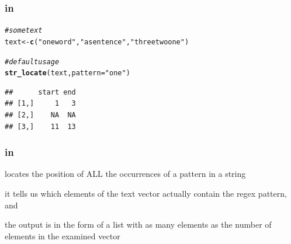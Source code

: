 \documentclass[12pt]{beamer}\usepackage[]{graphicx}\usepackage[]{color}
\makeatletter
\newcommand{\hlstr}[1]{\textcolor[rgb]{0.192,0.494,0.8}{#1}}%
\newcommand{\hlcom}[1]{\textcolor[rgb]{0.678,0.584,0.686}{\textit{#1}}}%
\newcommand{\hlstd}[1]{\textcolor[rgb]{0.345,0.345,0.345}{#1}}%
\newcommand{\hlkwb}[1]{\textcolor[rgb]{0.69,0.353,0.396}{#1}}%
\newcommand{\hlkwc}[1]{\textcolor[rgb]{0.333,0.667,0.333}{#1}}%
\newcommand{\hlkwd}[1]{\textcolor[rgb]{0.737,0.353,0.396}{\textbf{#1}}}%
\newenvironment{kframe}{%
 \def\at@end@of@kframe{}%
 \ifinner\ifhmode%
  \def\at@end@of@kframe{\end{minipage}}%
  \begin{minipage}{\columnwidth}%
 \fi\fi%
 \def\FrameCommand##1{\hskip\@totalleftmargin \hskip-\fboxsep
 \colorbox{shadecolor}{##1}\hskip-\fboxsep
     \hskip-\linewidth \hskip-\@totalleftmargin \hskip\columnwidth}%
 \MakeFramed {\advance\hsize-\width
   \@totalleftmargin\z@ \linewidth\hsize
   \@setminipage}}%
 {\par\unskip\endMakeFramed%
 \at@end@of@kframe}
\newenvironment{knitrout}{}{} %
\makeatother
\begin{document}

\begin{frame}[fragile]
\frametitle{ in }

\begin{knitrout}\footnotesize
{}\color{fgcolor}\begin{kframe}
\begin{alltt}
\hlcom{# some text}
\hlstd{text} \hlkwb{<-} \hlkwd{c}\hlstd{(}\hlstr{"one word"}\hlstd{,} \hlstr{"a sentence"}\hlstd{,} \hlstr{"three two one"}\hlstd{)}

\hlcom{# default usage}
\hlkwd{str_locate}\hlstd{(text,} \hlkwc{pattern} \hlstd{=} \hlstr{"one"}\hlstd{)}
\end{alltt}
\begin{verbatim}
##      start end
## [1,]     1   3
## [2,]    NA  NA
## [3,]    11  13
\end{verbatim}
\end{kframe}
\end{knitrout}

\end{frame}


\begin{frame}[fragile]
\frametitle{ in }

\bi
  \item {} locates the position of ALL the occurrences of a pattern in a string
  \item it tells us which elements of the text vector actually contain the regex pattern, and
 \item the output is in the form of a list with as many elements as the number of elements in the examined vector
\ei

\end{frame}

\end{document}
